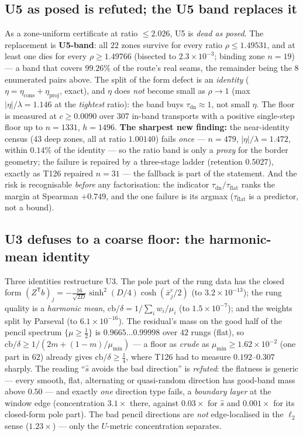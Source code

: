 \documentclass[11pt,a4paper]{article}
\begin{document}
\subsection{U5 as posed is refuted; the U5 band replaces it}
As a zone-uniform certificate at ratio $\le2.026$, U5 is \emph{dead as posed}. The replacement is
\textbf{U5-band}: all $22$ zones survive for every ratio $\rho\le1.49531$, and at least one dies
for every $\rho\ge1.49766$ (bisected to $2.3\times10^{-3}$; binding zone $n=19$) --- a band that
covers $99.26\%$ of the route's real seams, the remainder being the $8$ enumerated pairs above.
The split of the form defect is an \emph{identity} ($\eta=\eta_{\mathrm{cons}}+\eta_{\mathrm{proj}}$,
exact), and $\eta$ does \emph{not} become small as $\rho\to1$ (max $|\eta|/\lambda=1.146$ at the
\emph{tightest} ratio): the band buys $\tau_{\mathrm{dn}}\approx1$, not small $\eta$. The floor is
measured at $c\ge0.0090$ over $307$ in-band transports with a positive single-step floor up to
$n=1331$, $h=1496$. \textbf{The sharpest new finding:} the near-identity census ($43$ deep zones,
all at ratio $1.00140$) fails \emph{once} --- $n=479$, $|\eta|/\lambda=1.472$, within $0.14\%$ of
the identity --- so the ratio band is only a \emph{proxy} for the border geometry; the failure is
repaired by a three-stage ladder (retention $0.5027$), exactly as T126 repaired $n=31$ --- the
fallback is part of the statement. And the risk is recognisable \emph{before} any factorisation:
the indicator $\tau_{\mathrm{dn}}/\tau_{\mathrm{flat}}$ ranks the margin at Spearman $+0.749$, and
the one failure is its argmax ($\tau_{\mathrm{flat}}$ is a predictor, not a bound).

\subsection{U3 defuses to a coarse floor: the harmonic-mean identity}
Three identities restructure U3. The pole part of the rung data has the closed form
$(Z^{\mathsf T}b)_j=-\tfrac{16}{\sqrt{2D}}\sinh^2(D/4)\cosh(\bar x^{\mathrm c}_j/2)$ (to
$3.2\times10^{-13}$); the rung quality is a \emph{harmonic mean},
$\mathrm{cb}/\delta=1/\sum_i w_i/\mu_i$ (to $1.5\times10^{-7}$); and the weights split by Parseval
(to $6.1\times10^{-16}$). The residual's mass on the good half of the pencil spectrum
$\{\mu\ge\tfrac12\}$ is $0.9665\ldots0.99998$ over $42$ rungs (flat), so
$\mathrm{cb}/\delta\ge1/(2m+(1-m)/\mu_{\min})$ --- a floor as \emph{crude} as
$\mu_{\min}\ge1.62\times10^{-2}$ (one part in $62$) already gives $\mathrm{cb}/\delta\ge\tfrac14$,
where T126 had to measure $0.192$--$0.307$ sharply. The reading ``$\hat s$ avoids the bad
direction'' is \emph{refuted}: the flatness is generic --- every smooth, flat, alternating or
quasi-random direction has good-band mass above $0.50$ --- and exactly \emph{one} direction type
fails, a \emph{boundary layer} at the window edge (concentration $3.1\times$ there, against
$0.03\times$ for $\hat s$ and $0.001\times$ for its closed-form pole part). The bad pencil
directions are \emph{not} edge-localised in the $\ell_2$ sense ($1.23\times$) --- only the
$U$-metric concentration separates.
\end{document}
